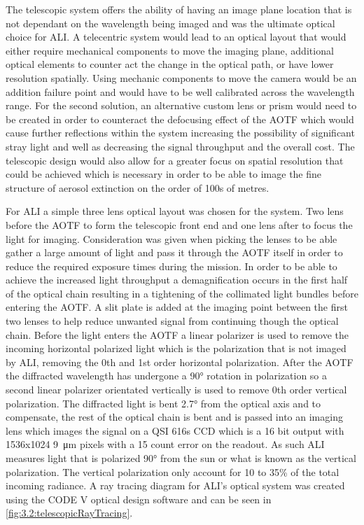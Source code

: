 \documentclass[12pt]{article}
\begin{document}
The telescopic system offers the ability of having an image plane location that is not dependant on the wavelength being imaged and was the ultimate optical choice for ALI. A telecentric system would lead to an optical layout that would either require mechanical components to move the imaging plane, additional optical elements to counter act the change in the optical path, or have lower resolution spatially. Using mechanic components to move the camera would be an addition failure point and would have to be well calibrated across the wavelength range. For the second solution, an alternative custom lens or prism would need to be created in order to counteract the defocusing effect of the AOTF which would cause further reflections within the system increasing the possibility of significant stray light and well as decreasing the signal throughput and the overall cost. The telescopic design would also allow for a greater focus on spatial resolution that could be achieved which is necessary in order to be able to image the fine structure of aerosol extinction on the order of 100s of metres.

For ALI a simple three lens optical layout was chosen for the system. Two lens before the AOTF to form the telescopic front end and one lens after to focus the light for imaging. Consideration was given when picking the lenses to be able gather a large amount of light and pass it through the AOTF itself in order to reduce the required exposure times during the mission. In order to be able to achieve the increased light throughput a demagnification occurs in the first half of the optical chain resulting in a tightening of the collimated light bundles before entering the AOTF. A slit plate is added at the imaging point between the first two lenses to help reduce unwanted signal from continuing though the optical chain. Before the light enters the AOTF a linear polarizer is used to remove the incoming horizontal polarized light which is the polarization that is not imaged by ALI, removing the 0th and 1st order horizontal polarization. After the AOTF the diffracted wavelength has undergone a 90\si{\degree} rotation in polarization so a second linear polarizer orientated vertically is used to remove 0th order vertical polarization. The diffracted light is bent 2.7\si{\degree} from the optical axis and to compensate, the rest of the optical chain is bent and is passed into an imaging lens which images the signal on a QSI 616s CCD which is a 16 bit output with 1536x1024 9~\si{\micro\metre} pixels with a 15 count error on the readout. As such ALI measures light that is polarized 90\si{\degree} from the sun or what is known as the vertical polarization. The vertical polarization only account for 10 to 35\% of the total incoming radiance. A ray tracing diagram for ALI's optical system was created using the CODE V optical design software and can be seen in \autoref{fig:3.2:telescopicRayTracing}.
\end{document}
